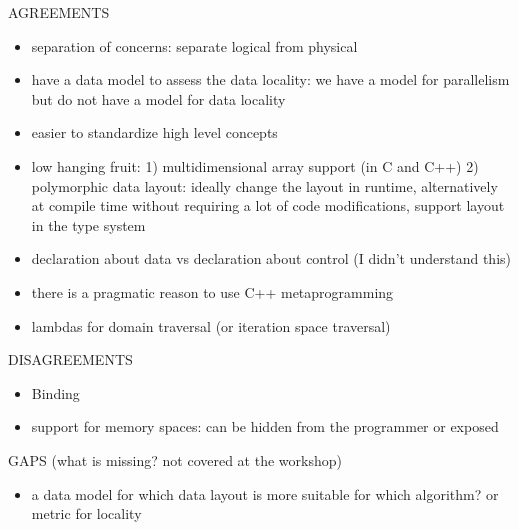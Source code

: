 AGREEMENTS
\begin{itemize}
\item separation of concerns: separate logical from physical 
\item have a data model to assess the data locality: we have a model for parallelism but do not have a model for data locality
\item easier to standardize high level concepts 
\item low hanging fruit: 
  1) multidimensional array support (in C and C++) 
  2) polymorphic data layout: 
  ideally change the layout in runtime, 
  alternatively at compile time without requiring a lot of code modifications, 
  support layout in the type system 
\item declaration about data vs declaration about control (I didn't understand this)
\item there is a pragmatic reason to use C++ metaprogramming
\item lambdas for domain traversal (or iteration space traversal)
\end{itemize}

DISAGREEMENTS
\begin{itemize}
  \item Binding 
  \item support for memory spaces: can be hidden from the programmer or exposed 
\end{itemize}

GAPS (what is missing? not covered at the workshop)
\begin{itemize}
  \item a data model for which data layout is more suitable for which algorithm? or metric for locality
\end{itemize}


